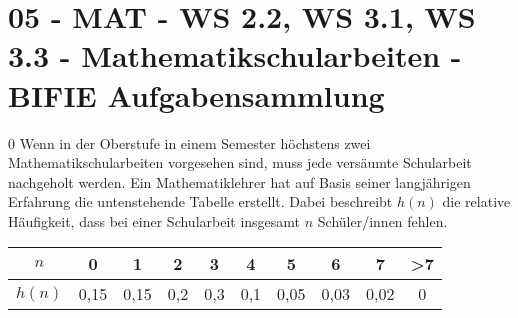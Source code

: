 \section{05 - MAT - WS 2.2, WS 3.1, WS 3.3 - Mathematikschularbeiten - BIFIE Aufgabensammlung}

\begin{langesbeispiel} \item[0] %
Wenn in der Oberstufe in einem Semester höchstens zwei Mathematikschularbeiten vorgesehen sind, muss jede versäumte Schularbeit nachgeholt werden.
				Ein Mathematiklehrer hat auf Basis seiner langjährigen Erfahrung die untenstehende Tabelle erstellt. Dabei beschreibt $h(n)$ die relative Häufigkeit, dass bei einer Schularbeit insgesamt $n$ Schüler/innen fehlen.\vspace{0,3cm}
				
\begin{center}
				\begin{tabular}{|c|c|c|c|c|c|c|c|c|c|} \hline
				$n$&0&1&2&3&4&5&6&7&>7\\ \hline
				$h(n)$&0,15&0,15&0,2&0,3&0,1&0,05&0,03&0,02&0\\ \hline
				\end{tabular}	
\end{center}%

\begin{aufgabenstellung}
\item %


\item %

\end{aufgabenstellung}
\end{langesbeispiel}
